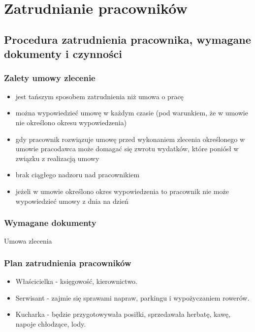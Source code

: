 \documentclass{sprawozdanie-agh}
\begin{document}
	\section{Zatrudnianie pracowników}

		\subsection{Procedura zatrudnienia pracownika, wymagane dokumenty i czynności}

		\subsubsection{Zalety umowy zlecenie}
		\begin{itemize}
			\item jest tańszym sposobem zatrudnienia niż umowa o pracę
			\item można wypowiedzieć umowę w każdym czasie (pod warunkiem, że w umowie nie określono okresu wypowiedzenia)
			\item gdy pracownik rozwiązuje umowę przed wykonaniem zlecenia określonego w umowie pracodawca może domagać się zwrotu wydatków, które poniósł w związku z realizacją umowy
			\item brak ciągłego nadzoru nad pracownikiem
			\item jeżeli w umowie określono okres wypowiedzenia to pracownik nie może wypowiedzieć umowy z dnia na dzień
		\end{itemize}
		
		\subsubsection{Wymagane dokumenty}
		Umowa zlecenia

		\subsubsection{Plan zatrudnienia pracowników}

		\begin{itemize}
		\item Właścicielka - księgowość, kierownictwo. 
		\item Serwisant - zajmie się sprawami napraw, parkingu i wypożyczaniem rowerów.
		\item Kucharka - będzie przygotowywała posiłki, sprzedawała herbatę, kawę, napoje chłodzące, lody.
		\end{itemize}
	
\end{document}
